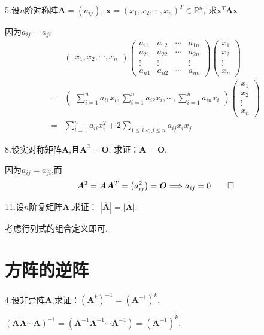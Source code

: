 5.设$n$阶对称阵$\bm{A}=\left(a_{ij}\right)$,
$\bm{x}=\left(x_1,x_2,\cdots,x_n\right)^T\in \mathbb{R}^n$,
求$\bm{x}^T\bm{Ax}.$
\begin{solution}
因为$a_{ij}=a_{ji}$
\begin{align*}
	&\begin{pmatrix}
		x_1,x_2,\cdots,x_n
	\end{pmatrix}\begin{pmatrix}
		a_{11}&a_{12}&\cdots&a_{1n}\\
		a_{21}&a_{22}&\cdots&a_{2n}\\
		\vdots&\vdots&&\vdots\\
		a_{n1}&a_{n2}&\cdots&a_{nn}
	\end{pmatrix}\begin{pmatrix}
		x_1\\
		x_2\\
		\vdots\\
		x_n
	\end{pmatrix}\\
	=&\begin{pmatrix}
		\sum\limits_{i=1}^na_{i1}x_i,
		\sum\limits_{i=1}^{n}a_{i2}x_i,\cdots,
		\sum\limits_{i=1}^{n}a_{in}x_i
	\end{pmatrix}
	\begin{pmatrix}
		x_1\\x_2\\\vdots\\x_n
	\end{pmatrix}
	\\
	=&\sum_{i=1}^{n}a_{ii}x_i^2+2\sum_{1\leqslant i<j\leqslant n}
	a_{ij}x_ix_j
\end{align*}
\end{solution}

8.设实对称矩阵$\bm{A}$,且$\bm{A}^2=\bm{O}$,
求证：$\bm{A}=\bm{O}$.
\begin{Proof}
	因为$a_{ij}=a_{ji}$,而
\[
\bm{A}^2=\bm{AA}^T=\left(a_{ij}^2\right)=\bm{O}\Longrightarrow a_{ij} = 0
\qedhere
\]
\end{Proof}

11.设$n$阶复矩阵$\bm{A}$,求证：
$\left|\overline{\bm{A}}\right|=
\overline{\left|\bm{A}\right|}$.
\begin{Proof}
考虑行列式的组合定义即可.
\end{Proof}

\section{方阵的逆阵}
4.设非异阵$\bm{A}$,求证：$\left(\bm{A}^k\right)^{-1}
=\left(\bm{A}^{-1}\right)^k.$
\begin{Proof}
$
\left(\bm{AA}\cdots\bm{A}\right)^{-1}=\left(\bm{A}^{-1}\bm{A}^{-1}\cdots\bm{A}^{-1}\right)=\left(\bm{A}^{-1}\right)^k
.$
\end{Proof}

